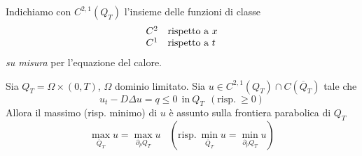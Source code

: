 \documentclass[10pt,a4paper,twoside,openright]{book}
\begin{document}
Indichiamo con $C^{2,1}(Q_{T})$ l'insieme delle funzioni di classe
\begin{equation*}
\begin{array}{ l l }
C^{2} & \text{rispetto a} \ x\\
C^{1} & \text{rispetto a} \ t
\end{array}
\end{equation*}
\textit{su misura} per l'equazione del calore.
\begin{theorem}
 Sia $Q_{T} =\Omega \times (0,T)$, $\Omega $ dominio limitato. Sia $u\in C^{2,1}(Q_{T}) \cap C(\overline{Q}_{T})$ tale che
\begin{equation*}
u_{t} -D\Delta u=q\leqslant 0\ \ \text{in} \ Q_{T} \ \ \left(\text{risp.} \ \geqslant 0\right)
\end{equation*}
Allora il massimo (risp. minimo) di $u$ è assunto sulla frontiera parabolica di $Q_{T}$
\begin{equation*}
\max_{\overline{Q}_{T}} u=\max_{\partial _{p} Q_{T}} u\ \ \ \ \left(\text{risp.} \ \min_{\overline{Q}_{T}} u=\min_{\partial _{p} Q_{T}} u\right)
\end{equation*}
\end{theorem}
\end{document}
